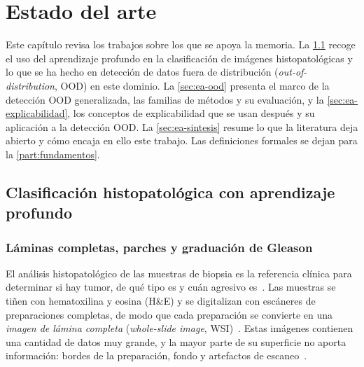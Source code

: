 %
%

\chapter{Estado del arte}\label{cap:estado-arte}

Este capítulo revisa los trabajos sobre los que se apoya la memoria. La
\cref{sec:ea-histopatologia} recoge el uso del aprendizaje profundo en la
clasificación de imágenes histopatológicas y lo que se ha hecho en detección de
datos fuera de distribución (\emph{out-of-distribution}, OOD) en este dominio. La \cref{sec:ea-ood} presenta el
marco de la detección OOD generalizada, las familias de métodos y su evaluación,
y la \cref{sec:ea-explicabilidad}, los conceptos de explicabilidad que se usan
después y su aplicación a la detección OOD. La \cref{sec:ea-sintesis} resume lo
que la literatura deja abierto y cómo encaja en ello este trabajo. Las
definiciones formales se dejan para la \cref{part:fundamentos}.

\section{Clasificación histopatológica con aprendizaje profundo}\label{sec:ea-histopatologia}

\subsection{Láminas completas, parches y graduación de Gleason}\label{sec:ea-wsi-gleason}

El análisis histopatológico de las muestras de biopsia es la referencia clínica
para determinar si hay tumor, de qué tipo es y cuán agresivo
es~\cite{ayensa2026}. Las muestras se tiñen con hematoxilina y eosina (H\&E) y
se digitalizan con escáneres de preparaciones completas, de modo que cada
preparación se convierte en una \emph{imagen de lámina completa}
(\emph{whole-slide image}, WSI)~\cite{ayensa2026}. Estas imágenes contienen una
cantidad de datos muy grande, y la mayor parte de su superficie no aporta
información: bordes de la preparación, fondo y artefactos de
escaneo~\cite{ayensa2026}.


